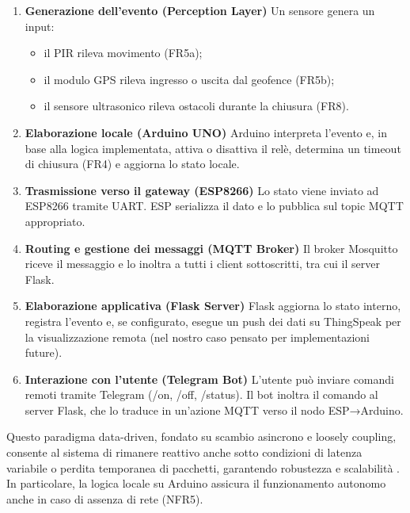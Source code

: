 \begin{enumerate}
\item \textbf{Generazione dell’evento (Perception Layer)}
Un sensore genera un input:
\begin{itemize}
\item il PIR rileva movimento (FR5a);
\item il modulo GPS rileva ingresso o uscita dal geofence (FR5b);
\item il sensore ultrasonico rileva ostacoli durante la chiusura (FR8).
\end{itemize}

\item \textbf{Elaborazione locale (Arduino UNO)}  
Arduino interpreta l’evento e, in base alla logica implementata, attiva o disattiva il relè, determina un timeout di chiusura (FR4) e aggiorna lo stato locale.

\item \textbf{Trasmissione verso il gateway (ESP8266)}  
Lo stato viene inviato ad ESP8266 tramite UART.  
ESP serializza il dato e lo pubblica sul topic MQTT appropriato.

\item \textbf{Routing e gestione dei messaggi (MQTT Broker)}  
Il broker Mosquitto riceve il messaggio e lo inoltra a tutti i client sottoscritti, tra cui il server Flask.

\item \textbf{Elaborazione applicativa (Flask Server)}  
Flask aggiorna lo stato interno, registra l’evento e, se configurato, esegue un push dei dati su ThingSpeak per la visualizzazione remota (nel nostro caso pensato per implementazioni future).

\item \textbf{Interazione con l’utente (Telegram Bot)}  
L’utente può inviare comandi remoti tramite Telegram (/on, /off, /status).  
Il bot inoltra il comando al server Flask, che lo traduce in un’azione MQTT verso il nodo ESP→Arduino.


\end{enumerate}


Questo paradigma data-driven, fondato su scambio asincrono e loosely coupling, consente al sistema di rimanere reattivo anche sotto condizioni di latenza variabile o perdita temporanea di pacchetti, garantendo robustezza e scalabilità \cite{Palattella2016, Piyare2013}.
In particolare, la logica locale su Arduino assicura il funzionamento autonomo anche in caso di assenza di rete (NFR5).




